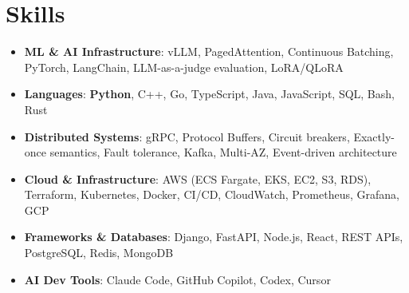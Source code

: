 \documentclass[letterpaper,11pt]{article}
\newcommand{\resumeSubHeadingListStart}{\begin{itemize}[leftmargin=0.15in, label={}]}
\newcommand{\resumeSubHeadingListEnd}{\end{itemize}}
\newcommand{\resumeSkillHeading}[2]{%
  \item\small{\textbf{#1}: #2 \vspace{-9pt}}%
}
\begin{document}
\section{Skills}
  \resumeSubHeadingListStart
    \resumeSkillHeading{ML \& AI Infrastructure}{vLLM, PagedAttention, Continuous Batching, PyTorch, LangChain, LLM-as-a-judge evaluation, LoRA/QLoRA}
    \resumeSkillHeading{Languages}{\textbf{Python}, C++, Go, TypeScript, Java, JavaScript, SQL, Bash, Rust}
    \resumeSkillHeading{Distributed Systems}{gRPC, Protocol Buffers, Circuit breakers, Exactly-once semantics, Fault tolerance, Kafka, Multi-AZ, Event-driven architecture}
    \resumeSkillHeading{Cloud \& Infrastructure}{AWS (ECS Fargate, EKS, EC2, S3, RDS), Terraform, Kubernetes, Docker, CI/CD, CloudWatch, Prometheus, Grafana, GCP}
    \resumeSkillHeading{Frameworks \& Databases}{Django, FastAPI, Node.js, React, REST APIs, PostgreSQL, Redis, MongoDB}
    \resumeSkillHeading{AI Dev Tools}{Claude Code, GitHub Copilot, Codex, Cursor}
  \resumeSubHeadingListEnd
\end{document}
